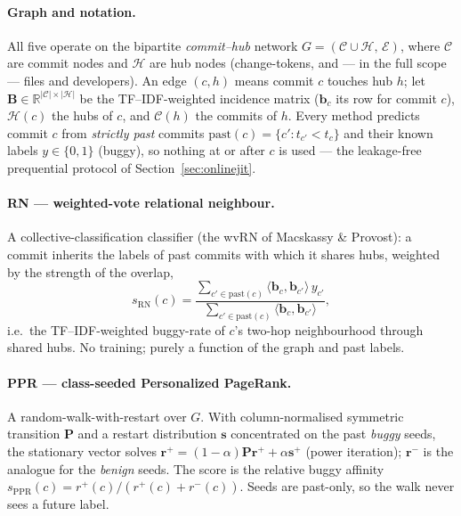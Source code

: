 \documentclass[11pt,a4paper]{article}
\begin{document}
	\paragraph{Graph and notation.} All five operate on the bipartite
	\emph{commit--hub} network $G=(\mathcal{C}\cup\mathcal{H},\,\mathcal{E})$, where
	$\mathcal{C}$ are commit nodes and $\mathcal{H}$ are hub nodes (change-tokens,
	and --- in the full scope --- files and developers). An edge $(c,h)$ means commit
	$c$ touches hub $h$; let $\mathbf{B}\in\mathbb{R}^{|\mathcal{C}|\times|\mathcal{H}|}$
	be the TF--IDF-weighted incidence matrix ($\mathbf{b}_c$ its row for commit $c$),
	$\mathcal{H}(c)$ the hubs of $c$, and $\mathcal{C}(h)$ the commits of $h$. Every
	method predicts commit $c$ from \emph{strictly past} commits
	$\mathrm{past}(c)=\{c':t_{c'}<t_c\}$ and their known labels $y\in\{0,1\}$ (buggy),
	so nothing at or after $c$ is used --- the leakage-free prequential protocol of
	Section~\ref{sec:onlinejit}.

	\paragraph{RN --- weighted-vote relational neighbour.} A collective-classification
	classifier (the wvRN of Macskassy \& Provost): a commit inherits the labels of
	past commits with which it shares hubs, weighted by the strength of the overlap,
	\[
	  s_{\mathrm{RN}}(c)=\frac{\sum_{c'\in\mathrm{past}(c)}\langle\mathbf{b}_c,\mathbf{b}_{c'}\rangle\,y_{c'}}
	                          {\sum_{c'\in\mathrm{past}(c)}\langle\mathbf{b}_c,\mathbf{b}_{c'}\rangle},
	\]
	i.e.\ the TF--IDF-weighted buggy-rate of $c$'s two-hop neighbourhood through
	shared hubs. No training; purely a function of the graph and past labels.

	\paragraph{PPR --- class-seeded Personalized PageRank.} A random-walk-with-restart
	over $G$. With column-normalised symmetric transition $\mathbf{P}$ and a restart
	distribution $\mathbf{s}$ concentrated on the past \emph{buggy} seeds, the
	stationary vector solves $\mathbf{r}^{+}=(1-\alpha)\mathbf{P}\mathbf{r}^{+}+\alpha\mathbf{s}^{+}$
	(power iteration); $\mathbf{r}^{-}$ is the analogue for the \emph{benign} seeds.
	The score is the relative buggy affinity
	$s_{\mathrm{PPR}}(c)=r^{+}(c)/\!\left(r^{+}(c)+r^{-}(c)\right)$. Seeds are past-only,
	so the walk never sees a future label.
\end{document}
